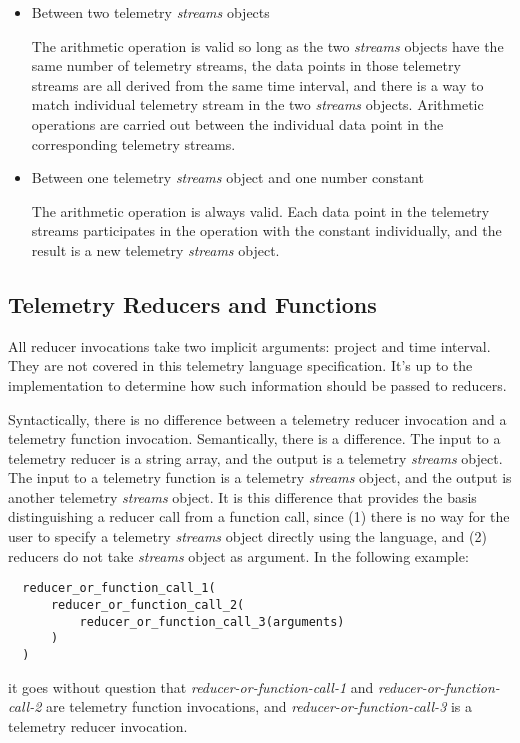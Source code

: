 \begin{itemize}
	\item Between two telemetry \textit{streams} objects

The arithmetic operation is valid so long as the two \textit{streams} objects have the same number of telemetry streams, the data points in those telemetry streams are all derived from the same time interval, and there is a way to match individual telemetry stream in the two \textit{streams} objects. Arithmetic operations are carried out between the individual data point in the corresponding telemetry streams.

  \item Between one telemetry \textit{streams} object and one number constant

The arithmetic operation is always valid. Each data point in the telemetry streams participates in the operation with the constant individually, and the result is a new telemetry \textit{streams} object.

\end{itemize}
 
 
 
\subsection{Telemetry Reducers and Functions}

All reducer invocations take two implicit arguments: project and time interval. They are not covered in this telemetry language specification. It's up to the implementation to determine how such information should be passed to reducers.

Syntactically, there is no difference between a telemetry reducer invocation and a telemetry function invocation. Semantically, there is a difference. The input to a telemetry reducer is a string array, and the output is a telemetry \textit{streams} object. The input to a telemetry function is a telemetry \textit{streams} object, and the output is another telemetry \textit{streams} object. It is this difference that provides the basis distinguishing a reducer call from a function call, since (1) there is no way for the user to specify a telemetry \textit{streams} object directly using the language, and (2) reducers do not take \textit{streams} object as argument. In the following example:

\begin{verbatim}
  reducer_or_function_call_1(
      reducer_or_function_call_2(
          reducer_or_function_call_3(arguments)
      )
  )
\end{verbatim}
it goes without question that \textit{reducer-or-function-call-1} and \textit{reducer-or-function-call-2} are telemetry function invocations, and \textit{reducer-or-function-call-3} is a telemetry reducer invocation.

